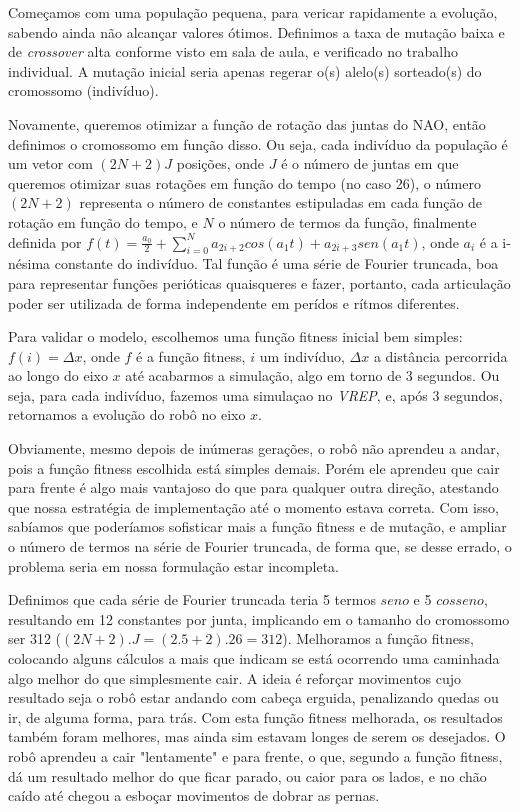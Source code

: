 \documentclass[twoside,conference,a4paper]{IEEEtran}
\begin{document}
Começamos com uma população pequena, para vericar rapidamente a evolução, sabendo ainda não alcançar valores ótimos. Definimos a taxa de mutação baixa e de \textsl{crossover} alta conforme visto em sala de aula, e verificado no trabalho individual. A mutação inicial seria apenas regerar o(s) alelo(s) sorteado(s) do cromossomo (indivíduo).

Novamente, queremos otimizar a função de rotação das juntas do NAO, então definimos o cromossomo em função disso. Ou seja, cada indivíduo da população é um vetor com $(2N+2)J$ posições, onde $J$ é o número de juntas em que queremos otimizar suas rotações em função do tempo (no caso 26), o número $(2N+2)$ representa o número de constantes estipuladas em cada função de rotação em função do tempo, e $N$ o número de termos da função, finalmente definida por $f(t) = \frac{a_0}{2}+\sum_{i=0}^N a_{2i+2} cos(a_{1} t) + a_{2i+3} sen(a_{1} t)$, onde $a_i$ é a i-nésima constante do indivíduo. Tal função é uma série de Fourier truncada, boa para representar funções perióticas quaisqueres e fazer, portanto, cada articulação poder ser utilizada de forma independente em perídos e rítmos diferentes.

Para validar o modelo, escolhemos uma função fitness inicial bem simples: $f(i)=\Delta x$, onde $f$ é a função fitness, $i$ um indivíduo, $\Delta x$ a distância percorrida ao longo do eixo $x$ até acabarmos a simulação, algo em torno de 3 segundos. Ou seja, para cada indivíduo, fazemos uma simulaçao no \textsl{VREP}, e, após 3 segundos, retornamos a evolução do robô no eixo $x$.

Obviamente, mesmo depois de inúmeras gerações, o robô não aprendeu a andar, pois a função fitness escolhida está simples demais. Porém ele aprendeu que cair para frente é algo mais vantajoso do que para qualquer outra direção, atestando que nossa estratégia de implementação até o momento estava correta. Com isso, sabíamos que poderíamos sofisticar mais a função fitness e de mutação, e ampliar o número de termos na série de Fourier truncada, de forma que, se desse errado, o problema seria em nossa formulação estar incompleta.

Definimos que cada série de Fourier truncada teria 5 termos $seno$ e 5 $cosseno$, resultando em 12 constantes por junta, implicando em o tamanho do cromossomo ser 312 ($(2N + 2) . J = (2 . 5 + 2) . 26 = 312$). Melhoramos a função fitness, colocando alguns cálculos a mais que indicam se está ocorrendo uma caminhada algo melhor do que simplesmente cair. A ideia é reforçar movimentos cujo resultado seja o robô estar andando com cabeça erguida, penalizando quedas ou ir, de alguma forma, para trás. Com esta função fitness melhorada, os resultados também foram melhores, mas ainda sim estavam longes de serem os desejados. O robô aprendeu a cair "lentamente" e para frente, o que, segundo a função fitness, dá um resultado melhor do que ficar parado, ou caior para os lados, e no chão caído até chegou a esboçar movimentos de dobrar as pernas.
\end{document}
